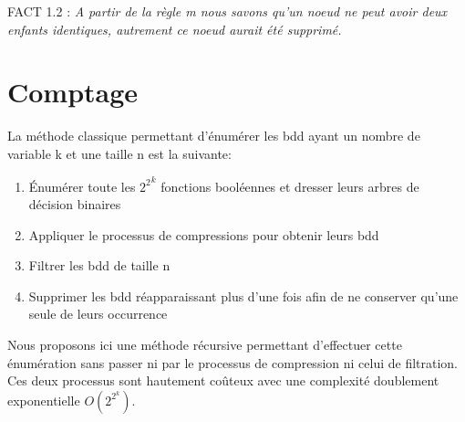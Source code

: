 \documentclass[french]{article}
\begin{document}
FACT 1.2 : \emph{A partir de la règle m nous savons qu'un noeud ne peut avoir deux enfants identiques, autrement ce noeud aurait été supprimé.}

\section{Comptage}
La méthode classique permettant d'énumérer les bdd ayant un nombre de variable k et une taille n est la suivante:
\begin{enumerate}
    \item 
	Énumérer toute les \({2^2}^k\) fonctions booléennes et dresser leurs arbres de décision binaires
	\item
	Appliquer le processus de compressions pour obtenir leurs bdd
	\item
    Filtrer les bdd de taille n
	\item
	Supprimer les bdd réapparaissant plus d'une fois afin de ne conserver qu'une seule de leurs occurrence
\end{enumerate}
Nous proposons ici une méthode récursive permettant d'effectuer cette énumération sans passer ni par le processus de compression ni celui de filtration. Ces deux processus sont hautement coûteux avec une complexité doublement exponentielle \(O(2^{2^{k}})\).
\vspace{5mm} 
\end{document}
